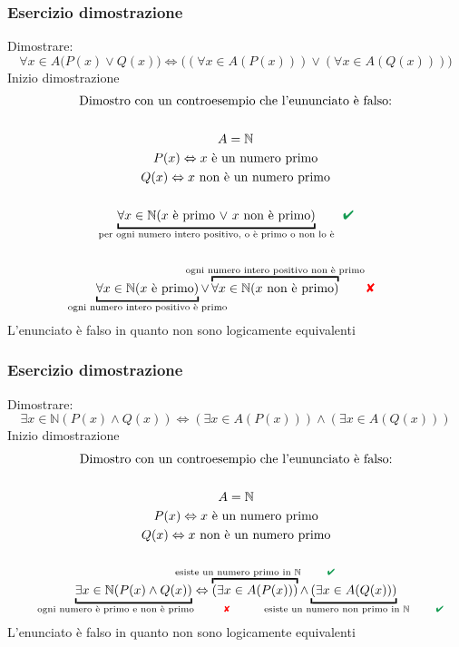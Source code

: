 \documentclass[italian]{article}
\newcommand{\N}{\text{$\mathbb{N}$}}
\newcommand{\crossmark}{\textcolor{red}{\text{$\qquad$\ding{56}}}}
\renewcommand{\checkmark}{\textcolor{ForestGreen}{\text{$\qquad$\ding{52}}}}
\begin{document}
\subsubsection{Esercizio dimostrazione}
Dimostrare:
\[
	\forall x \in A \bigr(P(x) \lor Q(x)) \Leftrightarrow ((\forall x \in A (P(x))) \lor (\forall x \in A(Q(x)))\bigr)
\]
Inizio dimostrazione
\begin{gather*}
	\text{Dimostro con un controesempio che l'eununciato è falso:}\\\\
	A = \N \\
	P(x) \Leftrightarrow \text{$x$ è un numero primo}\\
	Q(x) \Leftrightarrow \text{$x$ non è un numero primo}\\\\
	\underbracket{\forall x \in \N (\text{$x$ è primo $\lor$ $x$ non è primo})}_{\mathclap{\text{per ogni numero intero positivo, o è primo o non lo è}}} \checkmark\\\\
\underbracket{	\forall x \in \N (\text{$x$ è primo})}_{\mathclap{\text{ogni numero intero positivo è primo}}} \lor \overbracket{\forall x \in \N (\text{$x$ non è primo})}^{\mathclap{\text{ogni numero intero positivo non è primo}}} \crossmark
\end{gather*}
L'enunciato è falso in quanto non sono logicamente equivalenti


\subsubsection{Esercizio dimostrazione}
Dimostrare:
\[
	\exists x \in \N (P(x) \land Q(x)) \Leftrightarrow (\exists x \in A(P(x))) \land (\exists x \in A(Q(x)))
\]
Inizio dimostrazione
\begin{gather*}
	\text{Dimostro con un controesempio che l'eununciato è falso:}\\\\
	A = \N \\
	P(x) \Leftrightarrow \text{$x$ è un numero primo}\\
	Q(x) \Leftrightarrow \text{$x$ non è un numero primo}\\\\
	\underbracket{\exists x \in \N (P(x) \land Q(x))}_{\mathclap{\text{ogni numero è primo e non è primo \; \crossmark}}} \Leftrightarrow \overbracket{(\exists x \in A(P(x)))}^{\mathclap{\text{esiste un numero primo in \N \; \checkmark}}} \land \underbracket{(\exists x \in A(Q(x)))}_{\mathclap{\text{esiste un numero non primo in \N \; \checkmark}}}
\end{gather*}
L'enunciato è falso in quanto non sono logicamente equivalenti
\pagebreak
\end{document}
